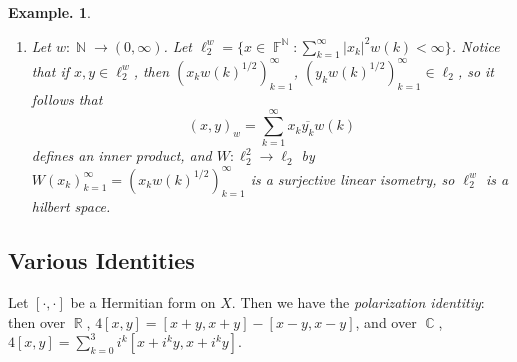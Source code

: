 \documentclass[11pt, a4paper]{memoir}
\DeclareMathOperator{\N}{{\mathbb{N}}}
\DeclareMathOperator{\R}{{\mathbb{R}}}
\DeclareMathOperator{\C}{{\mathbb{C}}}
\DeclareMathOperator{\F}{{\mathbb{F}}}
\newcommand{\norm}[1]{\ensuremath{\left\lVert#1\right\rVert}}
\theoremstyle{change}
\theoremstyle{plain}
\theoremstyle{nonumberplain}
\newtheorem{example}{Example.}
\newcommand{\lbr}[1]{\ensuremath{\left[#1\right]}}
\newcommand{\inr}[1]{\ensuremath{\left(#1\right)}}
\numberwithin{equation}{section}
\begin{document}
\begin{example}
\begin{enumerate}[r]
            Now, define $\ell_2(\Gamma)=\{x=(x_\gamma)\in\F^{\Gamma}:\sum_{\gamma\in\Gamma}|x_\gamma|^2<\infty\}$.
            If $x,y\in\ell_2(\Gamma)$, then we may let $\Gamma_{|x|^2}\cup\Gamma_{|y|^2}\subseteq\{\gamma_k\}_{k=1}^\infty$ so Hölder's inequality for $\ell_2$ says that
            \begin{equation*}
                \sum_{k=1}^\infty|x_{\gamma_k}\overline{y}_{\gamma_k}|\leq\left(\sum_{k=1}^\infty|x_{\gamma_k}|^2\right)^{1/2}\left(\sum_{k=1}^\infty|y_{\gamma_k}|^2\right)^{1/2}<\infty.
            \end{equation*}
            Thus, $\sum_{k=1}^\infty x_{\gamma_k}\overline{y_{\gamma_k}}$ is absolutely converging.
            Write $\inr{x,y}=\sum_{\gamma\in\Gamma}x_\gamma\overline{y_\gamma}=\sum_{k=1}^\infty x_{\gamma_k}\overline{y_{\gamma_k}}$.
            Now if $(x^{(n)})_{n=1}^\infty\subset\ell_2(\Gamma)$ is $\norm{\cdot}_2-$Cauchy, then $\Gamma'=\bigcup_{n=1}^\infty\Gamma_{|x^{(n)}|^2}$ is countable.
            Then since $\ell_2(\Gamma')\cong\ell_2$ (up to counting $\Gamma'$), so the Cauchy sequence has a limit.
            Thus $\ell_2(\Gamma)$ is a Hilbert space.
            It is immediate that $(\ell_2(\Gamma),\norm{\cdot}_2)$ is non-separable.
        \item Let $w:\N\to(0,\infty)$.
            Let $\ell_2^w=\{x\in\F^{\N}:\sum_{k=1}^\infty|x_k|^2w(k)<\infty\}$.
            Notice that if $x,y\in\ell_2^w$, then $(x_kw(k)^{1/2})_{k=1}^\infty$, $(y_kw(k)^{1/2})_{k=1}^\infty\in\ell_2$, so it follows that
            \begin{equation*}
                \inr{x,y}_w=\sum_{k=1}^\infty x_k\overline{y_k}w(k)
            \end{equation*}
            defines an inner product, and $W:\ell_2^2\to\ell_2$ by $W(x_k)_{k=1}^\infty=(x_kw(k)^{1/2})_{k=1}^\infty$ is a surjective linear isometry, so $\ell_2^w$ is a hilbert space.
    \end{enumerate}
\end{example}
\subsection{Various Identities}
Let $\lbr{\cdot,\cdot}$ be a Hermitian form on $X$.
Then we have the \textit{polarization identitiy}: then over $\R$, $4[x,y]=[x+y,x+y]-[x-y,x-y]$, and over $\C$, $4[x,y]=\sum_{k=0}^3 i^k[x+i^ky,x+i^ky]$.
\end{document}
